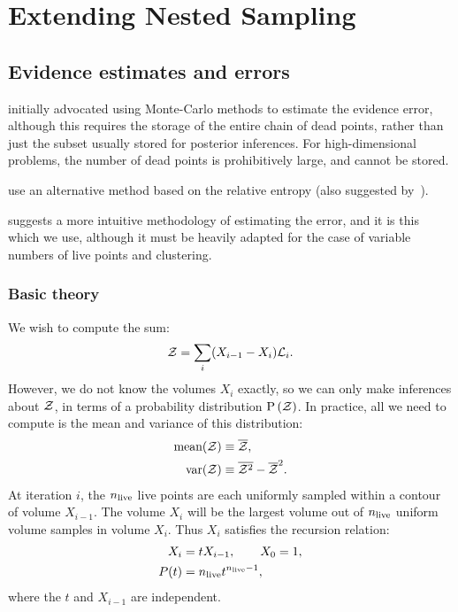 \chapter{Extending Nested Sampling}
\label{chap:ens}

\section{Evidence estimates and errors}                            
\label{sec:ens:evidences}

\cite{skilling2006} initially advocated using Monte-Carlo methods to estimate the evidence error, although this requires the storage of the entire chain of dead points, rather than just the subset usually stored for posterior inferences. For high-dimensional problems, the number of dead points is prohibitively large, and cannot be stored.

\cite{MultiNest2} use an alternative method based on the relative entropy (also suggested by~\cite{skilling2006}). 

\cite{Keeton} suggests a more intuitive methodology of estimating the error, and it is this which we use, although it must be heavily adapted for the case of variable numbers of live points and clustering.

\subsection{Basic theory}
\label{sec:ens:basic_theory}

We wish to compute the sum:
%
\begin{equation}
  \mathcal{Z} = \sum\limits_{i} (X_{i-1}-X_{i})\mathcal{L}_i.
  \label{eqn:ens:app_ev}
\end{equation}
%
However, we do not know the volumes $X_i$ exactly, so we can only make inferences about $\mathcal{Z}$, in terms of a probability distribution $\mathrm{P}\left(\mathcal{Z}\right)$. In practice, all we need to compute is the mean and variance of this distribution:
\begin{align}
  \text{mean}(\mathcal{Z}) &\equiv \overline{\mathcal{Z}},\\
  \text{var}(\mathcal{Z}) &\equiv \overline{\mathcal{Z}^2}-\overline{\mathcal{Z}}^2.
\end{align}
%
At iteration $i$, the $n_{\mathrm{live}}$ live points are each uniformly sampled within a contour of volume $X_{i-1}$. The volume $X_i$ will be the largest volume out of $n_{\mathrm{live}}$ uniform volume samples in volume $X_i$.
Thus $X_i$ satisfies the recursion relation:
%
\begin{align}
  X_i &= t X_{i-1}, \qquad X_0=1, \label{eqn:ens:rr_x} \\
  P(t) &= n_{\mathrm{live}} t^{n_{\mathrm{live}} - 1}, \label{eqn:ens:Pt}
\end{align}
%
where the $t$ and $X_{i-1}$ are independent.

